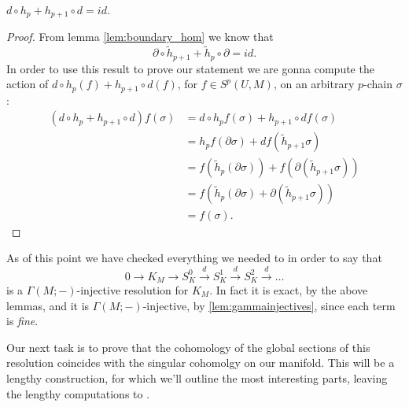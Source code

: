 \begin{lem}
	$d \circ h_{p} + h_{p+1} \circ d = id$.
\end{lem} 
\begin{proof}
	From lemma \ref{lem:boundary_hom} we know that
	\begin{equation}
		\partial \circ \widetilde{h}_{p+1} + \widetilde{h}_p \circ \partial = id
	.\end{equation} 
	In order to use this result to prove our statement we are gonna compute the action of $d \circ h_{p} (f) + h_{p+1} \circ d (f)$, for $f \in S^p(U, M)$, on an arbitrary $p$-chain $\sigma$:
	\begin{align}
		\left( d \circ h_p + h_{p+1} \circ d \right) f(\sigma)	 &= d \circ h_p f (\sigma) + h_{p+1} \circ d f (\sigma)\\
								    &= h_p f (\partial \sigma) + d f (\widetilde{h}_{p+1} \sigma) \\
								    &= f\left(\widetilde{h}_p (\partial \sigma)\right) + f\left(\partial (\widetilde{h}_{p+1} \sigma)\right) \\
								    &= f \left( \widetilde{h}_p (\partial \sigma) + \partial(\widetilde{h}_{p+1} \sigma) \right) \\
								    &= f ( \sigma )
	.\end{align} 
\end{proof}

\begin{rem}
	As of this point we have checked everything we needed to in order to say that
	\begin{equation}
	0 \to K_M \to S^0_K \xrightarrow{d} S^1_K \xrightarrow{d} S^2_K \xrightarrow{d} \ldots
	\end{equation} 
	is a $\Gamma(M;-)$-injective resolution for $K_M$.
	In fact it is exact, by the above lemmas, and it is $\Gamma(M;-)$-injective, by \ref{lem:gammainjectives}, since each term is \textit{fine}.
\end{rem}

Our next task is to prove that the cohomology of the global sections of this resolution coincides with the singular cohomolgy on our manifold.
This will be a lengthy construction, for which we'll outline the most interesting parts, leaving the lengthy computations to \cite{warner}.

